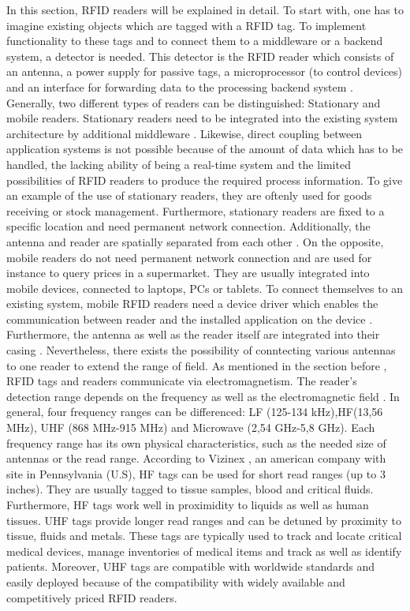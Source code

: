 In this section, RFID readers will be explained in detail. 
To start with, one has to imagine existing objects which are tagged with a RFID tag. To implement functionality to these tags and to connect them to a middleware or a backend system, a detector is needed. This detector is the RFID reader which consists of an antenna, a power supply for passive tags, a microprocessor (to control devices) and an interface for forwarding data to the processing backend system \cite{henrici}. 
Generally, two different types of readers can be distinguished: Stationary and mobile readers. Stationary readers need to be integrated into the existing system architecture by additional middleware \cite[p.133 ff.]{mobile}. Likewise, direct coupling between application systems is not possible because of the amount of data which has to be handled, the lacking ability of being a real-time system and the limited possibilities of RFID readers to produce the required process information. To give an example of the use of stationary readers, they are oftenly used for goods receiving or stock management. Furthermore, stationary readers are fixed to a specific location and need permanent network connection. Additionally, the antenna and reader are spatially separated from each other \cite[p.17 ff.]{fokus}.
On the opposite, mobile readers do not need permanent network connection and are used for instance to query prices in a supermarket. They are usually integrated into mobile devices, connected to laptops, \ac{PC}s or tablets. To connect themselves to an existing system, mobile RFID readers need a device driver which enables the communication between reader and the installed application on the device \cite[p.133 ff.]{mobile}. Furthermore, the antenna as well as the reader itself are integrated into their casing \cite[p.17 ff.]{fokus}.
Nevertheless, there exists the possibility of conntecting various antennas to one reader to extend the range of field.
As mentioned in the section before \pageref{tags}, RFID tags and readers communicate via electromagnetism. The reader's detection range depends on the frequency as well as the electromagnetic field \cite{henrici}. In general, four frequency ranges can be differenced: \ac{LF} (125-134 kHz),\ac{HF}(13,56 MHz), \ac{UHF} (868 MHz-915 MHz) and Microwave (2,54 GHz-5,8 GHz). Each frequency range has its own physical characteristics, such as the needed size of antennas or the read range.
According to Vizinex \cite{vizinex}, an american company with site in Pennsylvania (U.S), HF tags can be used for short read ranges (up to 3 inches). They are usually tagged to tissue samples, blood and critical fluids. Furthermore, HF tags work well in proximidity to liquids as well as human tissues. UHF tags provide longer read ranges and can be detuned by proximity to tissue, fluids and metals. These tags are typically used to track and locate critical medical devices, manage inventories of medical items and track as well as identify patients. Moreover, UHF tags are compatible with worldwide standards and easily deployed because of the compatibility with widely available and competitively priced RFID readers.
